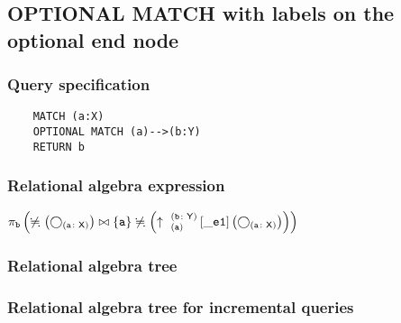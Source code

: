	\subsection{OPTIONAL MATCH with labels on the optional end node}

	\subsubsection*{Query specification}

	\begin{lstlisting}
	MATCH (a:X)
	OPTIONAL MATCH (a)-->(b:Y)
	RETURN b
	\end{lstlisting}


	\subsubsection*{Relational algebra expression}

	$\projection{\var{b}} \left(\alldifferent{} \left(\getvertices{a}{X}\right) \join \{\var{a}\} \alldifferent{} \left(\expandout{a}{b}{Y}{\_e1}{} \left(\getvertices{a}{X}\right)\right)\right)$

	\subsubsection*{Relational algebra tree}


	\subsubsection*{Relational algebra tree for incremental queries}

